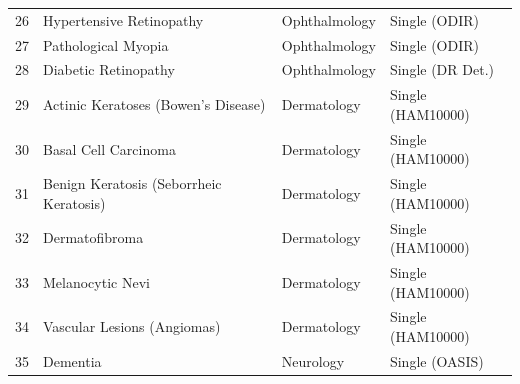 \documentclass[12pt,a4paper]{report}
\begin{document}
\begin{longtable}{@{}clll@{}}
26 & Hypertensive Retinopathy & Ophthalmology & Single (ODIR) \\
27 & Pathological Myopia & Ophthalmology & Single (ODIR) \\
28 & Diabetic Retinopathy & Ophthalmology & Single (DR Det.) \\
29 & Actinic Keratoses (Bowen's Disease) & Dermatology & Single (HAM10000) \\
30 & Basal Cell Carcinoma & Dermatology & Single (HAM10000) \\
31 & Benign Keratosis (Seborrheic Keratosis) & Dermatology & Single (HAM10000) \\
32 & Dermatofibroma & Dermatology & Single (HAM10000) \\
33 & Melanocytic Nevi & Dermatology & Single (HAM10000) \\
34 & Vascular Lesions (Angiomas) & Dermatology & Single (HAM10000) \\
35 & Dementia & Neurology & Single (OASIS) \\
\bottomrule
\end{longtable}
\endgroup
\end{document}
